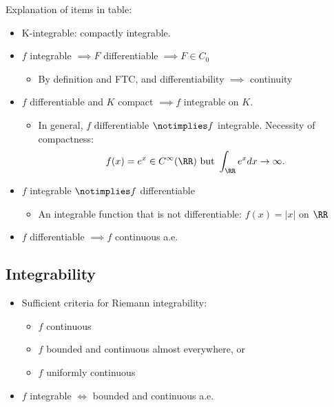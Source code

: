Explanation of items in table:

\begin{itemize}
\tightlist
\item
  K-integrable: compactly integrable.
\item
  \(f\) integrable \(\implies F\) differentiable \(\implies F \in C_0\)

  \begin{itemize}
  \tightlist
  \item
    By definition and FTC, and differentiability \(\implies\) continuity
  \end{itemize}
\item
  \(f\) differentiable and \(K\) compact \(\implies f\) integrable on
  \(K\).

  \begin{itemize}
  \tightlist
  \item
    In general, \(f\) differentiable \(\notimplies f\) integrable.
    Necessity of compactness:
    \begin{align*}  
    f(x) = e^x \in C^\infty(\RR)\text{ but }\int_\RR e^x dx \to \infty
    .\end{align*}
  \end{itemize}
\item
  \(f\) integrable \(\notimplies f\) differentiable

  \begin{itemize}
  \tightlist
  \item
    An integrable function that is not differentiable: \(f(x) = |x|\) on
    \(\RR\)
  \end{itemize}
\item
  \(f\) differentiable \(\implies f\) continuous a.e.
\end{itemize}

\hypertarget{integrability}{%
\subsection{Integrability}\label{integrability}}

\begin{itemize}
\tightlist
\item
  Sufficient criteria for Riemann integrability:

  \begin{itemize}
  \tightlist
  \item
    \(f\) continuous
  \item
    \(f\) bounded and continuous almost everywhere, or
  \item
    \(f\) uniformly continuous
  \end{itemize}
\item
  \(f\) integrable \(\iff\) bounded and continuous a.e.
\end{itemize}

